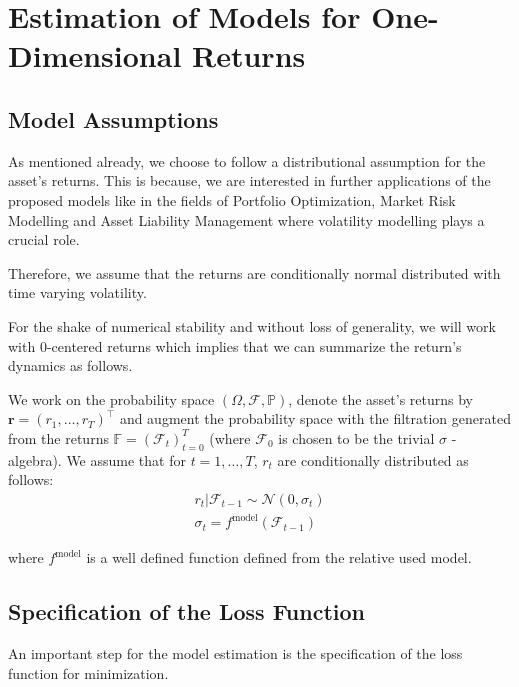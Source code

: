 \documentclass[a4paper, oneside]{discothesis}
\begin{document}
\chapter{Estimation of Models for One-Dimensional Returns}

\section{Model Assumptions}

As mentioned already, we choose to follow a distributional assumption for the asset's returns. This is because, we are interested in further applications of the proposed models like in the fields of Portfolio Optimization, Market Risk Modelling and Asset Liability Management where volatility modelling plays a crucial role.

Therefore, we assume that the returns are conditionally normal distributed with time varying volatility.

For the shake of numerical stability and without loss of generality, we will work with 0-centered returns which implies that we can summarize the return's dynamics as follows.

\begin{assumption}\label{as:main1d}
We work on the probability space $\left(\Omega, \mathcal{F}, \mathbb{P}\right)$, denote the asset's returns by $\mathbf{r} = (r_1, \dots, r_T)^\intercal$ and augment the probability space with the filtration generated from the returns $\mathbb{F} = (\mathcal{F}_t)_{t=0}^T$ (where $\mathcal{F}_0$ is chosen to be the trivial $\sigma$ - algebra). We assume that for $t=1, \dots, T$, $r_{t}$ are conditionally distributed as follows:
\begin{equation}
\begin{split}
r_{t}|\mathcal{F}_{t-1}\sim \mathcal{N}(0, \sigma_{t})\\
\sigma_{t} = f^{\text{model}}(\mathcal{F}_{t-1}) 
\end{split}
\end{equation}

where $f^{\text{model}}$ is a well defined function defined from the relative used model.
\end{assumption}
\section{Specification of the Loss Function}

An important step for the model estimation is the specification of the loss function for minimization.
\end{document}
